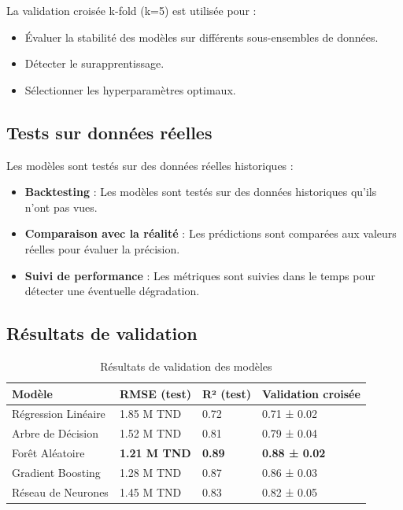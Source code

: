 La validation croisée k-fold (k=5) est utilisée pour :

\begin{itemize}
    \item Évaluer la stabilité des modèles sur différents sous-ensembles de données.
    \item Détecter le surapprentissage.
    \item Sélectionner les hyperparamètres optimaux.
\end{itemize}

\subsection{Tests sur données réelles}

Les modèles sont testés sur des données réelles historiques :

\begin{itemize}
    \item \textbf{Backtesting} : Les modèles sont testés sur des données historiques qu'ils n'ont pas vues.
    \item \textbf{Comparaison avec la réalité} : Les prédictions sont comparées aux valeurs réelles pour évaluer la précision.
    \item \textbf{Suivi de performance} : Les métriques sont suivies dans le temps pour détecter une éventuelle dégradation.
\end{itemize}

\subsection{Résultats de validation}

\begin{table}[H]
\centering
\begin{tabular}{|p{4cm}|p{3cm}|p{3cm}|p{3cm}|}
\hline
\textbf{Modèle} & \textbf{RMSE (test)} & \textbf{R² (test)} & \textbf{Validation croisée} \\
\hline
Régression Linéaire & 1.85 M TND & 0.72 & 0.71 ± 0.02 \\
\hline
Arbre de Décision & 1.52 M TND & 0.81 & 0.79 ± 0.04 \\
\hline
Forêt Aléatoire & \textbf{1.21 M TND} & \textbf{0.89} & \textbf{0.88 ± 0.02} \\
\hline
Gradient Boosting & 1.28 M TND & 0.87 & 0.86 ± 0.03 \\
\hline
Réseau de Neurones & 1.45 M TND & 0.83 & 0.82 ± 0.05 \\
\hline
\end{tabular}
\caption{Résultats de validation des modèles}
\label{tab:validation-results}
\end{table}

